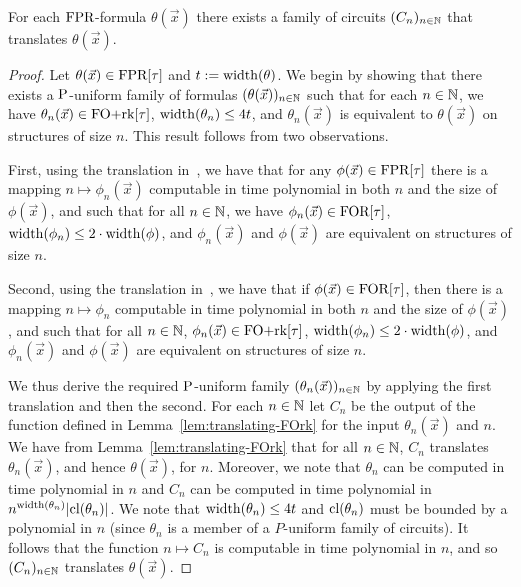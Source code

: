 \documentclass[../paper.tex]{subfiles}
\begin{document}
\begin{thm}
  For each $\text{\upshape FPR}$-formula $\theta(\vec{x})$ there exists a family of circuits
  $(C_n)_{n \in \mathbb{N}}$ that translates $\theta(\vec{x})$.
  \label{thm:translating-formulas-to-circuits}
\end{thm}
\begin{proof}
  Let $\theta(\vec{x}) \in \text{\upshape FPR}[\tau]$ and $t := \mathrm{width} (\theta)$. We begin by
  showing that there exists a $\mathrm{P}$-uniform family of formulas
  $(\theta(\vec{x}))_{n \in \mathbb{N}}$ such that for each $n \in \mathbb{N}$, we have
  $\theta_n(\vec{x}) \in \text{\upshape FO+rk}[\tau]$, $\mathrm{width}(\theta_n) \leq 4 t$, and
  $\theta_n(\vec{x})$ is equivalent to $\theta(\vec{x})$ on structures of size
  $n$. This result follows from two observations.

  First, using the translation in~\cite{Dawar09logicswith}, we have that for any
  $\phi(\vec{x}) \in \text{\upshape FPR}[\tau]$ there is a mapping $n \mapsto \phi_n(\vec{x})$
  computable in time polynomial in both $n$ and the size of $\phi(\vec{x})$, and
  such that for all $n \in \mathbb{N}$, we have $\phi_n(\vec{x}) \in \text{\upshape FOR}[\tau]$,
  $\mathrm{width} (\phi_n) \leq 2 \cdot \mathrm{width} (\phi)$, and $\phi_n(\vec{x})$ and
  $\phi(\vec{x})$ are equivalent on structures of size $n$.

  Second, using the translation in~\cite{libkin2004elements}, we have that if
  $\phi (\vec{x}) \in \text{\upshape FOR}[\tau]$, then there is a mapping $n \mapsto \phi_n$
  computable in time polynomial in both $n$ and the size of $\phi(\vec{x})$, and
  such that for all $n \in \mathbb{N}$, $\phi_n(\vec{x}) \in \text{\upshape FO+rk}[\tau]$,
  $\mathrm{width}(\phi_n) \leq 2 \cdot \mathrm{width}(\phi)$, and $\phi_n(\vec{x})$ and
  $\phi(\vec{x})$ are equivalent on structures of size $n$.


  We thus derive the required $\mathrm{P}$-uniform family $(\theta_n(\vec{x}))_{n \in
    \mathbb{N}}$ by applying the first translation and then the second. For each $n
  \in \mathbb{N}$ let $C_n$ be the output of the function defined in
  Lemma~\ref{lem:translating-FOrk} for the input $\theta_n(\vec{x})$ and $n$. We
  have from Lemma~\ref{lem:translating-FOrk} that for all $n \in \mathbb{N}$, $C_n$
  translates $\theta_n(\vec{x})$, and hence $\theta(\vec{x})$, for $n$.
  Moreover, we note that $\theta_n$ can be computed in time polynomial in $n$
  and $C_n$ can be computed in time polynomial in $n^{\mathrm{width}(\theta_n)} \vert
  \mathrm{cl}(\theta_n) \vert$. We note that $\mathrm{width}(\theta_n) \leq 4t$ and
  $\mathrm{cl}(\theta_n)$ must be bounded by a polynomial in $n$ (since $\theta_n$ is a
  member of a $P$-uniform family of circuits). It follows that the function $n
  \mapsto C_n$ is computable in time polynomial in $n$, and so $(C_n)_{n \in
    \mathbb{N}}$ translates $\theta(\vec{x})$.
\end{proof}
\end{document}
